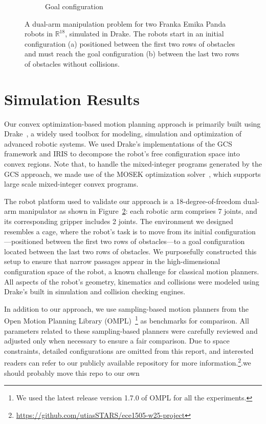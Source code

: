 \begin{figure}[!t]
\begin{subfigure}[b]{0.19\textwidth}
        \captionsetup{justification=centering}
        \caption{Goal configuration}
        \label{subfig:cage_goal_orbit}
    \end{subfigure}
    \caption{A dual-arm manipulation problem for two Franka Emika Panda robots in $\mathbb{R}^{18}$, simulated in Drake. The robots start in an initial configuration (a) positioned between the first two rows of obstacles and must reach the goal configuration (b) between the last two rows of obstacles without collisions.}
    \label{fig:simulation}
\end{figure}

\section{Simulation Results}\label{sec:results}

Our convex optimization-based motion planning approach is primarily built using Drake~\cite{drake}, a widely used toolbox for modeling, simulation and optimization of advanced robotic systems.
We used Drake's implementations of the GCS framework and IRIS to decompose the robot's free configuration space into convex regions.
Note that, to handle the mixed-integer programs generated by the GCS approach, we made use of the MOSEK optimization solver~\cite{mosek}, which supports large scale mixed-integer convex programs.

The robot platform used to validate our approach is a 18-degree-of-freedom dual-arm manipulator as shown in Figure~\ref{fig:simulation}: each robotic arm comprises 7 joints, and its corresponding gripper includes 2 joints.
The environment we designed resembles a cage, where the robot's task is to move from its initial configuration---positioned between the first two rows of obstacles---to a goal configuration located between the last two rows of obstacles.
We purposefully constructed this setup to ensure that narrow passages appear in the high-dimensional configuration space of the robot, a known challenge for classical motion planners.
All aspects of the robot's geometry, kinematics and collisions were modeled using Drake's built in simulation and collision checking engines.

In addition to our approach, we use sampling-based motion planners from the Open Motion Planning Library (OMPL)~\cite{sucan2012open}\footnote{We used the latest release version 1.7.0 of OMPL for all the experiments.} as benchmarks for comparison. All parameters related to these sampling-based planners were carefully reviewed and adjusted only when necessary to ensure a fair comparison. Due to space constraints, detailed configurations are omitted from this report, and interested readers can refer to our publicly available repository for more information.\footnote{\url{https://github.com/utiasSTARS/ece1505-w25-project}}.{\color{red}we should probably move this repo to our own}

